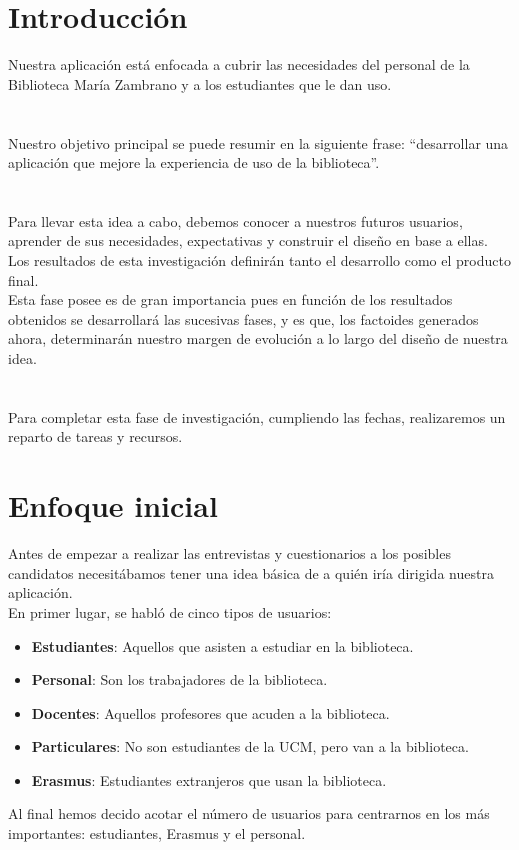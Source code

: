 \documentclass[12pt]{article}
\begin{document}
\section{Introducción}
Nuestra aplicación está enfocada a cubrir las necesidades del personal de la Biblioteca María Zambrano y a los estudiantes que le dan uso.\\
\\
\\
Nuestro objetivo principal se puede resumir en la siguiente frase:
“desarrollar una aplicación que mejore la experiencia de uso de la biblioteca”.\\
\\
\\
Para llevar esta idea a cabo, debemos conocer a nuestros futuros usuarios, aprender de sus necesidades, expectativas y construir el diseño en base a ellas.\\ Los resultados de esta investigación definirán tanto el desarrollo como el producto final.\\ Esta fase posee es de gran importancia pues en función de los resultados obtenidos se desarrollará las sucesivas fases, y es que, los factoides generados ahora, determinarán nuestro margen de evolución a lo largo del diseño de nuestra idea.\\
\\
\\
Para completar esta fase de investigación, cumpliendo las fechas, realizaremos un reparto de tareas y recursos.\\ 
\section{Enfoque inicial}
Antes de empezar a realizar las entrevistas y cuestionarios a los posibles candidatos necesitábamos tener una idea básica de a quién iría dirigida nuestra aplicación.\\ En primer lugar, se habló de cinco tipos de usuarios:
\begin{itemize}

\item \textbf{Estudiantes}: Aquellos que asisten a estudiar en la biblioteca.\\
\item \textbf{Personal}: Son los trabajadores de la biblioteca.\\
\item \textbf{Docentes}: Aquellos profesores que acuden a la biblioteca.\\
\item \textbf{Particulares}: No son estudiantes de la UCM, pero van a la biblioteca.\\
\item \textbf{Erasmus}: Estudiantes extranjeros que usan la biblioteca.\\

\end{itemize}
Al final hemos decido acotar el número de usuarios para centrarnos en los más importantes: estudiantes, Erasmus y el personal.\\
\end{document}
